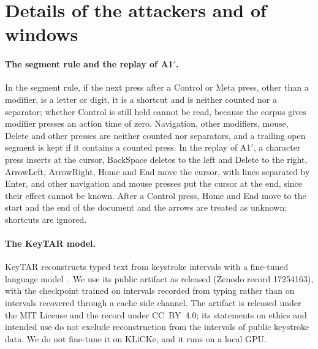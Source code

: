 \section{Details of the attackers and of windows}
\label{app:attackers}


\paragraph{The segment rule and the replay of A1$'$.}
In the segment rule, if the next press after a Control or Meta press, other than a modifier, is a letter or digit, it
is a shortcut and is neither counted nor a separator; whether Control is still held cannot be read, because the corpus
gives modifier presses an action time of zero. Navigation, other modifiers, mouse, Delete and other presses are
neither counted nor separators, and a trailing open segment is kept if it contains a counted press. In the replay of
A1$'$, a character press inserts at the cursor, BackSpace deletes to the left and Delete to the right, ArrowLeft,
ArrowRight, Home and End move the cursor, with lines separated by Enter, and other navigation and mouse presses put the
cursor at the end, since their effect cannot be known. After a Control press, Home and End move to the start and the
end of the document and the arrows are treated as unknown; shortcuts are ignored.

\paragraph{The KeyTAR model.}
KeyTAR reconstructs typed text from keystroke intervals with a fine-tuned language model~\cite{qiu2026keytar}. We use
its public artifact as released (Zenodo record 17254163), with the checkpoint trained on intervals recorded from typing
rather than on intervals recovered through a cache side channel. The artifact is released under the MIT License and the
record under CC~BY~4.0; its statements on ethics and intended use do not exclude reconstruction from the intervals of
public keystroke data. We do not fine-tune it on KLiCKe, and it runs on a local GPU.

